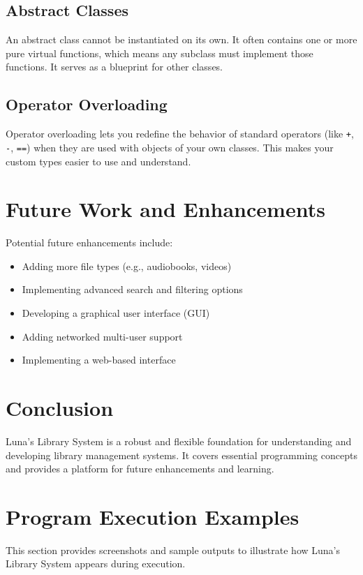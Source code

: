 \documentclass[a4paper,12pt]{article}
\begin{document}
\subsection{Abstract Classes}
An abstract class cannot be instantiated on its own. It often contains one or more pure virtual functions, which means any subclass must implement those functions. It serves as a blueprint for other classes.

\subsection{Operator Overloading}
Operator overloading lets you redefine the behavior of standard operators (like \texttt{+}, \texttt{-}, \texttt{==}) when they are used with objects of your own classes. This makes your custom types easier to use and understand.

\section{Future Work and Enhancements}
Potential future enhancements include:
\begin{itemize}
    \item Adding more file types (e.g., audiobooks, videos)
    \item Implementing advanced search and filtering options
    \item Developing a graphical user interface (GUI)
    \item Adding networked multi-user support
    \item Implementing a web-based interface
\end{itemize}

\section{Conclusion}
Luna's Library System is a robust and flexible foundation for understanding and developing library management systems. It covers essential programming concepts and provides a platform for future enhancements and learning.

\section{Program Execution Examples}

This section provides screenshots and sample outputs to illustrate how Luna's Library System appears during execution.
\end{document}
